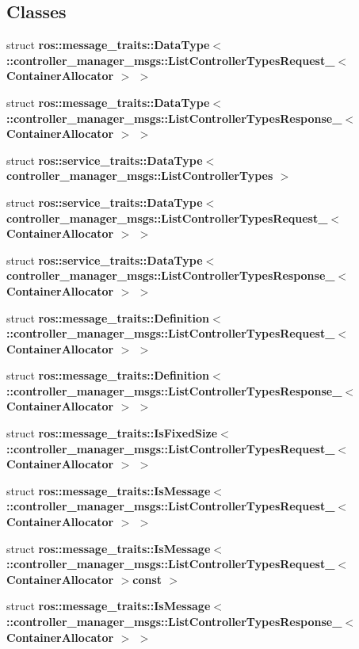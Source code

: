 \subsection*{\-Classes}
\begin{DoxyCompactItemize}
\item 
struct {\bf ros\-::message\-\_\-traits\-::\-Data\-Type$<$ \-::controller\-\_\-manager\-\_\-msgs\-::\-List\-Controller\-Types\-Request\-\_\-$<$ Container\-Allocator $>$ $>$}
\item 
struct {\bf ros\-::message\-\_\-traits\-::\-Data\-Type$<$ \-::controller\-\_\-manager\-\_\-msgs\-::\-List\-Controller\-Types\-Response\-\_\-$<$ Container\-Allocator $>$ $>$}
\item 
struct {\bf ros\-::service\-\_\-traits\-::\-Data\-Type$<$ controller\-\_\-manager\-\_\-msgs\-::\-List\-Controller\-Types $>$}
\item 
struct {\bf ros\-::service\-\_\-traits\-::\-Data\-Type$<$ controller\-\_\-manager\-\_\-msgs\-::\-List\-Controller\-Types\-Request\-\_\-$<$ Container\-Allocator $>$ $>$}
\item 
struct {\bf ros\-::service\-\_\-traits\-::\-Data\-Type$<$ controller\-\_\-manager\-\_\-msgs\-::\-List\-Controller\-Types\-Response\-\_\-$<$ Container\-Allocator $>$ $>$}
\item 
struct {\bf ros\-::message\-\_\-traits\-::\-Definition$<$ \-::controller\-\_\-manager\-\_\-msgs\-::\-List\-Controller\-Types\-Request\-\_\-$<$ Container\-Allocator $>$ $>$}
\item 
struct {\bf ros\-::message\-\_\-traits\-::\-Definition$<$ \-::controller\-\_\-manager\-\_\-msgs\-::\-List\-Controller\-Types\-Response\-\_\-$<$ Container\-Allocator $>$ $>$}
\item 
struct {\bf ros\-::message\-\_\-traits\-::\-Is\-Fixed\-Size$<$ \-::controller\-\_\-manager\-\_\-msgs\-::\-List\-Controller\-Types\-Request\-\_\-$<$ Container\-Allocator $>$ $>$}
\item 
struct {\bf ros\-::message\-\_\-traits\-::\-Is\-Message$<$ \-::controller\-\_\-manager\-\_\-msgs\-::\-List\-Controller\-Types\-Request\-\_\-$<$ Container\-Allocator $>$ $>$}
\item 
struct {\bf ros\-::message\-\_\-traits\-::\-Is\-Message$<$ \-::controller\-\_\-manager\-\_\-msgs\-::\-List\-Controller\-Types\-Request\-\_\-$<$ Container\-Allocator $>$const  $>$}
\item 
struct {\bf ros\-::message\-\_\-traits\-::\-Is\-Message$<$ \-::controller\-\_\-manager\-\_\-msgs\-::\-List\-Controller\-Types\-Response\-\_\-$<$ Container\-Allocator $>$ $>$}

\end{DoxyCompactItemize}
